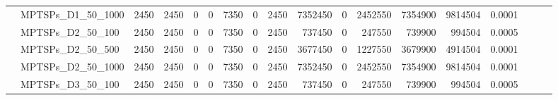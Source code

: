 \begin{landscape}
\begin{longtable}[c]{llrrrrrrrrrrrrrlll}
		& MPTSPs\_D1\_50\_1000         & 2450                        & 2450                       & 0                          & 0                           & 7350                       & 0                          & 2450                       & 7352450                   & 0                         & 2452550                    & 7354900                    & 9814504                        & 0.0001                        &                          &                          &                          \\
		& MPTSPs\_D2\_50\_100          & 2450                        & 2450                       & 0                          & 0                           & 7350                       & 0                          & 2450                       & 737450                    & 0                         & 247550                     & 739900                     & 994504                         & 0.0005                        &                          &                          &                          \\
		& MPTSPs\_D2\_50\_500          & 2450                        & 2450                       & 0                          & 0                           & 7350                       & 0                          & 2450                       & 3677450                   & 0                         & 1227550                    & 3679900                    & 4914504                        & 0.0001                        &                          &                          &                          \\
		& MPTSPs\_D2\_50\_1000         & 2450                        & 2450                       & 0                          & 0                           & 7350                       & 0                          & 2450                       & 7352450                   & 0                         & 2452550                    & 7354900                    & 9814504                        & 0.0001                        &                          &                          &                          \\
		& MPTSPs\_D3\_50\_100          & 2450                        & 2450                       & 0                          & 0                           & 7350                       & 0                          & 2450                       & 737450                    & 0                         & 247550                     & 739900                     & 994504                         & 0.0005                        &                          &                          &                          \\

\end{longtable}
\end{landscape}
